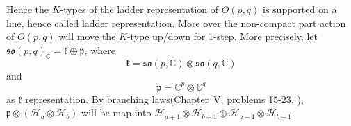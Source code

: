 \documentclass[12pt]{article}
\def\bR{{\mathbb{R}}}
\def\bN{{\mathbb{N}}}
\def\bC{{\mathbb{C}}}
\def\aso{\mathfrak{so}}
\def\fpp{\mathfrak{p}}
\def\fkk{\mathfrak{k}}
\def\chh{\mathcal{H}}
\begin{document}
Hence the $K$-types of the ladder representation of $O(p,q)$ is supported on 
a line, hence called ladder representation. More over 
the non-compact part action of $O(p,q)$ will move the $K$-type up/down 
for 1-step. More precisely, let $\aso(p,q)_\bC = \fkk\oplus \fpp$, where
\[
\fkk = \aso(p,\bC) \otimes \aso(q,\bC)
\]
and
\[
\fpp = \bC^p\otimes \bC^q
\]
as $\fkk$ representation. 
By branching laws(Chapter~V, problems 15-23\cite{Knapp1996Lie},\cite{KimLee2010} ), $\fpp\otimes (\chh_a\otimes \chh_b) $ will be map into $\chh_{a+1}\otimes\chh_{b+1}\oplus \chh_{a-1}\otimes \chh_{b-1}$. 






\end{document}
